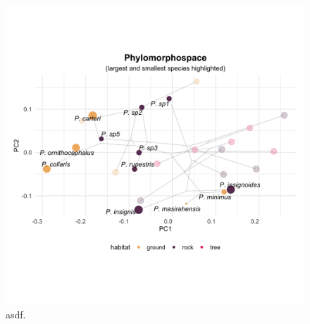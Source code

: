 \documentclass[
]{article}
\begin{document}
\newpage

\begin{figure}
\includegraphics[width=1\linewidth]{Figs/phylomorphospace_large_small} \caption{asdf.}\label{fig:unnamed-chunk-4}
\end{figure}
\end{document}
